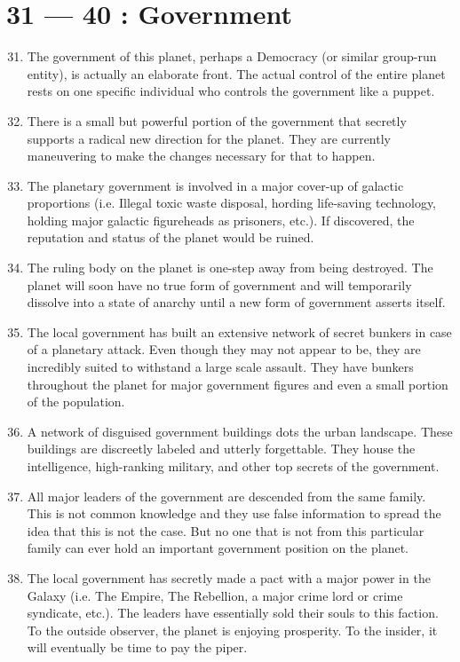 \documentclass{article}
\begin{document}
\section*{31 --- 40 : Government}
\begin{enumerate}
	\setcounter{enumi}{30}
	\item The government of this planet, perhaps a Democracy (or similar group-run entity), is actually an elaborate front. The actual control of the entire planet rests on one specific individual who controls the government like a puppet.
	\item There is a small but powerful portion of the government that secretly supports a radical new direction for the planet. They are currently maneuvering to make the changes necessary for that to happen.
	\item The planetary government is involved in a major cover-up of galactic proportions (i.e. Illegal toxic waste disposal, hording life-saving technology, holding major galactic figureheads as prisoners, etc.). If discovered, the reputation and status of the planet would be ruined.
	\item The ruling body on the planet is one-step away from being destroyed. The planet will soon have no true form of government and will temporarily dissolve into a state of anarchy until a new form of government asserts itself.
	\item The local government has built an extensive network of secret bunkers in case of a planetary attack. Even though they may not appear to be, they are incredibly suited to withstand a large scale assault. They have bunkers throughout the planet for major government figures and even a small portion of the population.
	\item A network of disguised government buildings dots the urban landscape. These buildings are discreetly labeled and utterly forgettable. They house the intelligence, high-ranking military, and other top secrets of the government.
	\item All major leaders of the government are descended from the same family. This is not common knowledge and they use false information to spread the idea that this is not the case. But no one that is not from this particular family can ever hold an important government position on the planet.
	\item The local government has secretly made a pact with a major power in the Galaxy (i.e. The Empire, The Rebellion, a major crime lord or crime syndicate, etc.). The leaders have essentially sold their souls to this faction. To the outside observer, the planet is enjoying prosperity. To the insider, it will eventually be time to pay the piper.

\end{enumerate}
\end{document}
